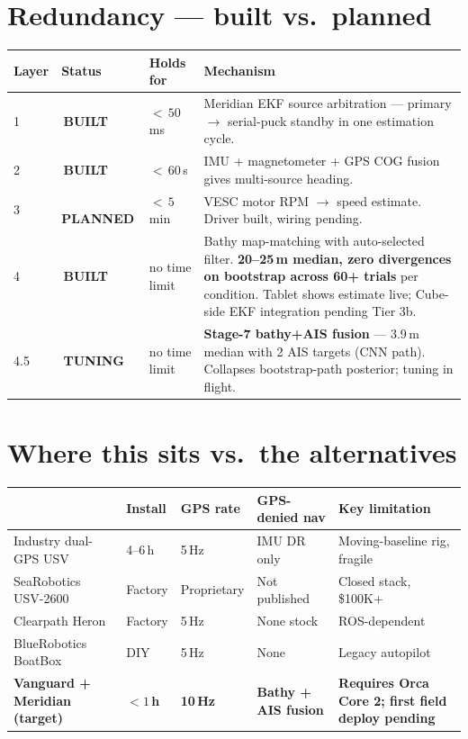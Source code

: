 \documentclass[10pt,a4paper]{article}
\newcommand{\statusbuilt}{{\color{white}\colorbox{mSafe}{\small\bfseries\,BUILT\,}}}
\newcommand{\statusplan}{{\color{white}\colorbox{mWarn}{\small\bfseries\,PLANNED\,}}}
\newcommand{\statustuning}{{\color{white}\colorbox{mWarn}{\small\bfseries\,TUNING\,}}}
\begin{document}
\section{Redundancy — built vs.\ planned}
\begin{tabularx}{\textwidth}{@{}l l l X@{}}
\toprule
\textbf{Layer} & \textbf{Status} & \textbf{Holds for} & \textbf{Mechanism} \\
\midrule
\rowcolor{mRow} 1 & \statusbuilt & ${<}\,50$\,ms & Meridian EKF source arbitration — primary $\rightarrow$ serial-puck standby in one estimation cycle. \\
2 & \statusbuilt & ${<}\,60$\,s & IMU + magnetometer + GPS COG fusion gives multi-source heading. \\
\rowcolor{mRow} 3 & \statusplan & ${<}\,5$\,min & VESC motor RPM $\rightarrow$ speed estimate. Driver built, wiring pending. \\
4 & \statusbuilt & no time limit & Bathy map-matching with auto-selected filter. \textbf{20--25\,m median, zero divergences on bootstrap across 60+ trials} per condition. Tablet shows estimate live; Cube-side EKF integration pending Tier 3b. \\
\rowcolor{mRow} 4.5 & \statustuning & no time limit & \textbf{Stage-7 bathy+AIS fusion} — 3.9\,m median with 2 AIS targets (CNN path). Collapses bootstrap-path posterior; tuning in flight. \\
\bottomrule
\end{tabularx}

\section{Where this sits vs.\ the alternatives}
\begin{tabularx}{\textwidth}{@{}L{38mm} l l l X@{}}
\toprule
\textbf{} & \textbf{Install} & \textbf{GPS rate} & \textbf{GPS-denied nav} & \textbf{Key limitation} \\
\midrule
{} Industry dual-GPS USV & 4--6\,h & 5\,Hz & IMU DR only & Moving-baseline rig, fragile \\
SeaRobotics USV-2600 & Factory & Proprietary & Not published & Closed stack, \$100K+ \\
 Clearpath Heron & Factory & 5\,Hz & None stock & ROS-dependent \\
BlueRobotics BoatBox & DIY & 5\,Hz & None & Legacy autopilot \\
\textbf{Vanguard + Meridian (target)} & \textbf{${<}1$\,h} & \textbf{10\,Hz} & \textbf{Bathy + AIS fusion} & \textbf{Requires Orca Core 2; first field deploy pending} \\
\bottomrule
\end{tabularx}
\end{document}
